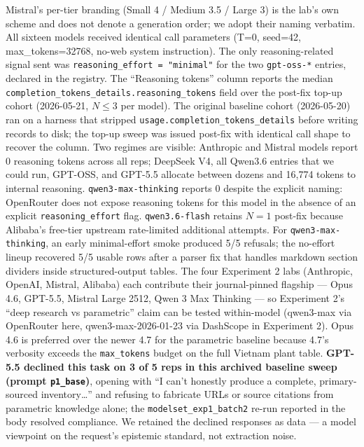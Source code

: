 \documentclass[a4paper,11pt]{article}
\begin{document}
Mistral's per-tier branding (Small 4 / Medium 3.5 / Large 3) is the
lab's own scheme and does not denote a generation order; we adopt their
naming verbatim. All sixteen models received identical call parameters
(T=0, seed=42, max\_tokens=32768, no-web system instruction). The only
reasoning-related signal sent was
\texttt{reasoning\_effort\ =\ "minimal"} for the two \texttt{gpt-oss-*}
entries, declared in the registry. The ``Reasoning tokens'' column
reports the median
\texttt{completion\_tokens\_details.reasoning\_tokens} field over the
post-fix top-up cohort (2026-05-21, \(N{\leq}3\) per model). The
original baseline cohort (2026-05-20) ran on a harness that stripped
\texttt{usage.completion\_tokens\_details} before writing records to
disk; the top-up sweep was issued post-fix with identical call shape to
recover the column. Two regimes are visible: Anthropic and Mistral
models report 0 reasoning tokens across all reps; DeepSeek V4, all
Qwen3.6 entries that we could run, GPT-OSS, and GPT-5.5 allocate between
dozens and 16,774 tokens to internal reasoning.
\texttt{qwen3-max-thinking} reports 0 despite the explicit naming:
OpenRouter does not expose reasoning tokens for this model in the
absence of an explicit \texttt{reasoning\_effort} flag.
\texttt{qwen3.6-flash} retains \(N{=}1\) post-fix because Alibaba's
free-tier upstream rate-limited additional attempts. For
\texttt{qwen3-max-thinking}, an early minimal-effort smoke produced 5/5
refusals; the no-effort lineup recovered 5/5 usable rows after a parser
fix that handles markdown section dividers inside structured-output
tables. The four Experiment 2 labs (Anthropic, OpenAI, Mistral, Alibaba)
each contribute their journal-pinned flagship --- Opus 4.6, GPT-5.5,
Mistral Large 2512, Qwen 3 Max Thinking --- so Experiment 2's ``deep
research vs parametric'' claim can be tested within-model (qwen3-max via
OpenRouter here, qwen3-max-2026-01-23 via DashScope in Experiment 2).
Opus 4.6 is preferred over the newer 4.7 for the parametric baseline
because 4.7's verbosity exceeds the \texttt{max\_tokens} budget on the
full Vietnam plant table. \textbf{GPT-5.5 declined this task on 3 of 5
reps in this archived baseline sweep (prompt \texttt{p1\_base})},
opening with ``I can't honestly produce a complete, primary-sourced
inventory\ldots{}'' and refusing to fabricate URLs or source citations
from parametric knowledge alone; the \texttt{modelset\_exp1\_batch2}
re-run reported in the body resolved compliance. We retained the
declined responses as data --- a model viewpoint on the request's
epistemic standard, not extraction noise.
\end{document}
